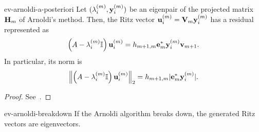 \begin{Lemma}{ev-arnoldi-a-posteriori}
  Let $(\lambda_i^{(m)},\vy_i^{(m)})$ be an eigenpair of the projected
  matrix $\matH_m$ of Arnoldi's method. Then, the Ritz vector
  $\vu_i^{(m)} = \matv_m \vy_i^{(m)}$ has a residual represented as
  \begin{gather}
    \left(A-\lambda_i^{(m)}\identity\right)\vu_i^{(m)}
    = h_{m+1,m}\ve_m^*\vy_i^{(m)}\vv_{m+1}.
  \end{gather}
  In particular, its norm is
  \begin{gather}
    \norm*{\left(A-\lambda_i^{(m)}\identity\right)\vu_i^{(m)}}_2
    = h_{m+1,m} \abs{\ve_m^*\vy_i^{(m)}}.
  \end{gather}
\end{Lemma}

\begin{proof}
  See~\cite[Proposition 6.8]{Saad11}.
\end{proof}

\begin{Corollary}{ev-arnoldi-breakdown}
  If the Arnoldi algorithm breaks down, the generated Ritz vectors are
  eigenvectors.
\end{Corollary}

